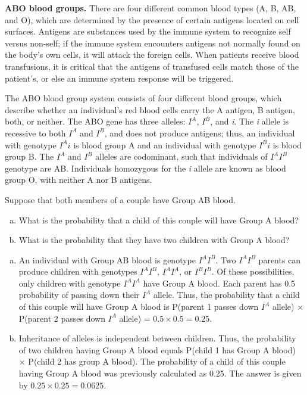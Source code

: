 \begin{example}{\textbf{ABO blood groups.} There are four different common blood types (A, B, AB, and O), which are determined by the presence of certain antigens located on cell surfaces. Antigens are substances used by the immune system to recognize self versus non-self; if the immune system encounters antigens not normally found on the body's own cells, it will attack the foreign cells. When patients receive blood transfusions, it is critical that the antigens of transfused cells match those of the patient's, or else an immune system response will be triggered.
		
The ABO blood group system consists of four different blood groups, which describe whether an individual's red blood cells carry the A antigen, B antigen, both, or neither. The ABO gene has three alleles: ${I}^{A}$, ${I}^{B}$, and \textit{i}. The \textit{i} allele is recessive to both ${I}^{A}$ and ${I}^{B}$, and does not produce antigens; thus, an individual with genotype ${I}^{A}i$ is blood group A and an individual with genotype ${I}^{B}i$ is blood group B. The ${I}^{A}$ and ${I}^{B}$ alleles are codominant, such that individuals of ${I}^{A}$${I}^{B}$ genotype are AB. Individuals homozygous for the \textit{i} allele are known as blood group O, with neither A nor B antigens.

Suppose that both members of a couple have Group AB blood.	
\begin{enumerate}[a)]
	\item What is the probability that a child of this couple will have Group A blood?
	\item What is the probability that they have two children with Group A blood?
\end{enumerate}	}

\begin{enumerate}[a)]
	\item An individual with Group AB blood is genotype ${I}^{A}$${I}^{B}$. Two ${I}^{A}$${I}^{B}$ parents can produce children with genotypes ${I}^{A}$${I}^{B}$, ${I}^{A}$${I}^{A}$, or ${I}^{B}$${I}^{B}$. Of these possibilities, only children with genotype ${I}^{A}$${I}^{A}$ have Group A blood. Each parent has 0.5 probability of passing down their ${I}^{A}$ allele. Thus, the probability that a child of this couple will have Group A blood is P(parent 1 passes down ${I}^{A}$ allele) $\times$ P(parent 2 passes down ${I}^{A}$ allele) = $0.5 \times 0.5 = 0.25$.
	
	\item Inheritance of alleles is independent between children. Thus, the probability of two children having Group A blood equals P(child 1 has Group A blood) $\times$ P(child 2 has group A blood). The probability of a child of this couple having Group A blood was previously calculated as 0.25. The answer is given by $0.25 \times 0.25 = 0.0625$.
\end{enumerate}

\end{example}

